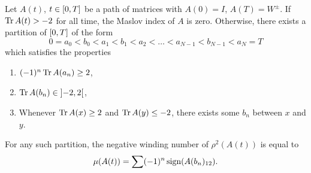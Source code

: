 \begin{prop}\label{calcmaslov0}
Let $A(t)$, $t \in \interval 0 T$ be a path of matrices with $A(0) = I$, $A(T) = W^\pm$. If $\operatorname{Tr} A(t) > -2$ for all time, the Maslov index of $A$ is zero. Otherwise, there exists a partition of $\interval 0 T$ of the form
\begin{equation}\label{calcmaslov:ab1}
0 = a_0 < b_0 < a_1 < b_1 < a_2 < \dots < a_{N-1} < b_{N-1} < a_N = T
\end{equation}
which satisfies the properties
\begin{enumerate}
\item\label{calcmaslov:ab2} $(-1)^n \operatorname{Tr} A(a_n) \geq 2$, \item\label{calcmaslov:ab3} $\trace A(b_n) \in \ointerval{-2}2$, \item\label{calcmaslov:ab4} Whenever $\operatorname{Tr} A(x) \geq 2$ and $\operatorname{Tr} A(y) \leq -2$, there exists some $b_n$ between $x$ and $y$.\end{enumerate}

For any such partition, the negative winding number of $\rho^2(A(t))$ is equal to
\begin{equation}\label{calcmaslov0:mu}
\mu(A(t)) = \sum (-1)^n \operatorname{sign}(A(b_n)_{12}).
\end{equation}
\end{prop}

